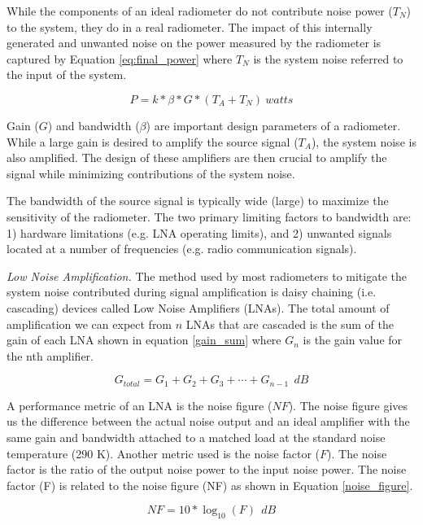 While the components of an ideal radiometer do not contribute noise power ($T_N$) to the system, they do in a real radiometer.  The impact of this internally generated and unwanted noise on the power measured by the radiometer is captured by Equation \ref{eq:final_power} where $T_N$ is the system noise referred to the input of the system.

\begin{equation} \label{eq:final_power}
P=k*\beta*G*(T_{A}+T_{N})\ watts
\end{equation}

Gain ($G$) and bandwidth ($\beta$) are important design parameters of a radiometer.  While a large gain is desired to amplify the source signal ($T_A$), the system noise is also amplified.  The design of these amplifiers are then crucial to amplify the signal while minimizing contributions of the system noise.

The bandwidth of the source signal is typically wide (large) to maximize the sensitivity of the radiometer.  The two primary limiting factors to bandwidth are: 1) hardware limitations (e.g. LNA operating limits), and 2) unwanted signals located at a number of frequencies (e.g. radio communication signals).

\emph{Low Noise Amplification.}  The method used by most radiometers to mitigate the system noise contributed during signal amplification is daisy chaining (i.e. cascading) devices called Low Noise Amplifiers (LNAs).  The total amount of amplification we can expect from $n$ LNAs that are cascaded is the sum of the gain of each LNA shown in equation \ref{gain_sum} where $G_n$ is the gain value for the nth amplifier.

\begin{equation}\label{gain_sum}
G_{total}=G_1 + G_2 + G_3 + \cdots +G_{n-1}\ \ dB
\end{equation}

A performance metric of an LNA is the noise figure ($NF$).  The noise figure gives us the difference between the actual noise output and an ideal amplifier with the same gain and bandwidth attached to a matched load at the standard noise temperature (290 K).  Another metric used is the noise factor ($F$).  The noise factor is the ratio of the output noise power to the input noise power.  The noise factor (F) is related to the noise figure (NF) as shown in Equation \ref{noise_figure}.

\begin{equation}\label{noise_figure}
NF=10 * \log_{10}(F)\ \ dB
\end{equation}

